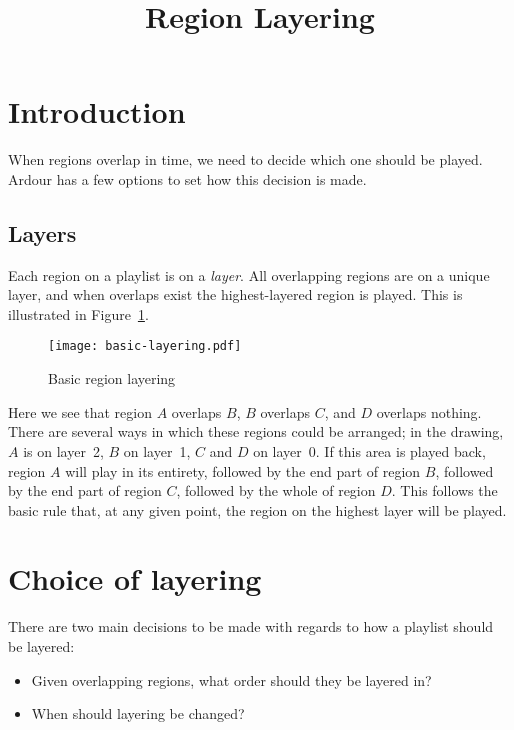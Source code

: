 \documentclass{article}
\title{Region Layering}
\author{}
\date{}
\begin{document}
\maketitle

\section{Introduction}

When regions overlap in time, we need to decide which one should be
played.  Ardour has a few options to set how this decision is made.


\subsection{Layers}

Each region on a playlist is on a \emph{layer}.  All overlapping regions
are on a unique layer, and when overlaps exist the highest-layered
region is played.  This is illustrated in Figure~\ref{fig:basic-layering}.

\begin{figure}[ht]
\begin{center}
\texttt{[image: basic-layering.pdf]}
\end{center}
\caption{Basic region layering}
\label{fig:basic-layering}
\end{figure}

Here we see that region $A$ overlaps $B$, $B$ overlaps $C$, and
$D$ overlaps nothing.  There are several ways in which these regions
could be arranged; in the drawing, $A$ is on layer~2, $B$ on layer~1,
$C$ and $D$ on layer~0.  If this area is played back, region $A$ will
play in its entirety, followed by the end part of region $B$, followed
by the end part of region $C$, followed by the whole of region $D$.
This follows the basic rule that, at any given point, the region on
the highest layer will be played.


\section{Choice of layering}

There are two main decisions to be made with regards to how a playlist should be layered:

\begin{itemize}
\item Given overlapping regions, what order should they be layered in?
\item When should layering be changed?
\end{itemize}
\end{document}
